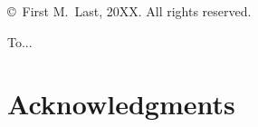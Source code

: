 \theoremstyle{mystyle}
\newtheorem{thm}[theorem]{Theorem}

\theoremstyle{mystyle}
\newtheorem{defn}[theorem]{Definition}

\theoremstyle{mystyle}
\newtheorem{fact}[theorem]{Fact}

\theoremstyle{mystyle}
\newtheorem{prop}[theorem]{Proposition}

\theoremstyle{mystyle}
\newtheorem{lem}[theorem]{Lemma}


\theoremstyle{mystyle}
\newtheorem{example}[theorem]{Example}

\captionsetup[subfigure]{labelfont=rm}

\setcounter{tocdepth}{2}


   \frontmatter

   \pagestyle{prelim}
   
   
   \newpage
	
	 \thispagestyle{empty}
	 \begin{titlepage}
	 \vspace*{50em}
	 \begin{center}
		 \copyright \ First M.\ Last, 20XX.  All rights reserved.  
	 \end{center}
	 \end{titlepage}
	 \newpage
	
	 \thispagestyle{empty}
	 \vspace*{20em}
	 \begin{center}
	   To...
	 \end{center}
	 \newpage
   
   \doublespacing
   
   \tableofcontents
   \newpage
   
   
   \newpage
   
   \section*{Acknowledgments}
   
   
